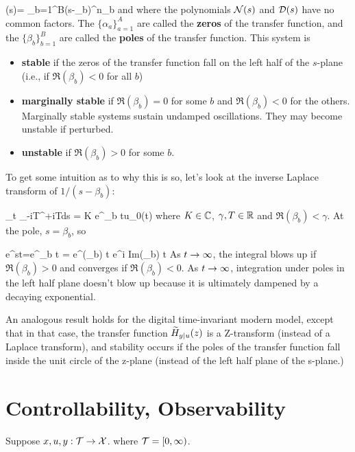 \beq
\cald(s)= \prod_{b=1}^{B}(s-\beta_b)^{n_b}
\eeq
and where 
the polynomials ${\cal N}(s)$ and ${\cal D}(s)$
have no common factors. The $\{\alpha_a\}_{a=1}^A$ are
called the {\bf zeros}
of the transfer function,
and the $\{\beta_b\}_{b=1}^B$ are called the
{\bf poles} of the transfer function.
This system
is 
\begin{itemize}
\item
{\bf stable} if the zeros of the
transfer function fall on the
left half of the $s$-plane (i.e., 
if $\Re(\beta_b)<0$ for all $b$)

\item
{\bf marginally stable} if
$\Re(\beta_b)=0$ for some $b$
and $\Re(\beta_b)<0$
for the others.
Marginally stable systems
sustain undamped oscillations.
They may become unstable
if perturbed.

\item {\bf unstable}
if $\Re(\beta_b)> 0$ for some $b$.
\end{itemize}

To get some intuition as to why this is so,
let's look at the inverse Laplace transform 
of $1/(s-\beta_b)$:

\beq
\lim_{t\rarrow \infty}
\int_{\gamma-iT}^{\gamma+iT}ds\;
= K e^{\beta_b t}u_0(t)
\eeq
where $K\in { \mathbb{C}}$,  $\gamma, T\in{ \mathbb{R}}$
and $\Re(\beta_b)< \gamma$.
At the pole, $s=\beta_b$, so


\beq
e^{st}=e^{\beta_b t} = e^{\Re(\beta_b) t}
e^{i Im(\beta_b) t}
\eeq
As $t\rightarrow \infty$, 
the integral blows up 
if $\Re(\beta_b)>0$ and
converges if $\Re(\beta_b)<0$.
As $t\rightarrow \infty$, 
integration under poles in
the left half plane
doesn't
blow up
because it is ultimately
dampened by a decaying
exponential.

An analogous result holds for the
digital time-invariant 
modern model,
except that in that case,
the transfer function ${\widetilde{H}}_{y|u}(z)$
is a Z-transform (instead of a Laplace
transform), and stability
occurs if the poles of the transfer
function fall inside the unit circle 
of the z-plane (instead
of the left half plane
of the s-plane.)



\section{
Controllability,
Observability}
Suppose $x, u, y:{\cal T}\rightarrow {\cal X}$.
 where ${\cal T}=[0, \infty)$.
 
